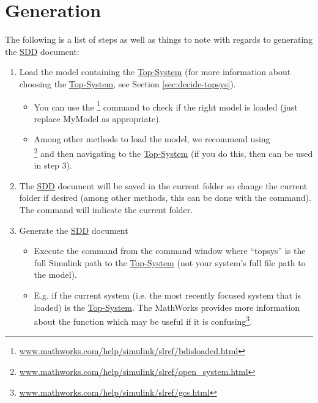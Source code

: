 \documentclass{mcscert}
\newcommand{\mathworks}{The MathWorks}
\newcommand{\simulink}{Simulink}
\newcommand{\topsystemnolink}{Top-System} %
\newcommand{\topsystem}{\hyperref[def:topsystem]{\topsystemnolink{}}}
\begin{document}
\section{Generation}
\label{sec:generation}
The following is a list of steps as well as things to note with regards to generating the \hyperref[acr:sdd]{SDD} document:

\begin{enumerate}
  \item Load the model containing the \topsystem{} (for more information about choosing the \topsystem{}, see Section \hyperref[sec:decide-topsys]{\ref*{sec:decide-topsys}}).
		\begin{itemize}
			\item You can use the \footnote{\href{https://www.mathworks.com/help/simulink/slref/bdisloaded.html}{www.mathworks.com/help/simulink/slref/bdisloaded.html}} command to check if the right model is loaded (just replace MyModel as appropriate).
			\item Among other methods to load the model, we recommend using\\ \footnote{\href{https://www.mathworks.com/help/simulink/slref/open_system.html}{www.mathworks.com/help/simulink/slref/open\_system.html}} and then navigating to the \topsystem{} (if you do this, then  can be used in step 3).
		\end{itemize}
		\item The \hyperref[acr:sdd]{SDD} document will be saved in the current \matlab{} folder so change the current folder if desired (among other methods, this can be done with the  command). 
		The  command will indicate the current folder.
  	\item Generate the \hyperref[acr:sdd]{SDD} document \label{itm:call-gen-sdd}
	\begin{itemize}
		\item Execute the  command from the \matlab{} command window where ``topsys'' is the full \simulink{} path to the \topsystem{} (not your system's full file path to the model).
		\item E.g.  if the current system (i.e. the most recently focused system that is loaded) is the \topsystem{}. 
		\mathworks{} provides more information about the  function which may be useful if it is confusing\footnote{\href{https://www.mathworks.com/help/simulink/slref/gcs.html}{www.mathworks.com/help/simulink/slref/gcs.html}}.

\end{itemize}
\end{enumerate}
\end{document}
